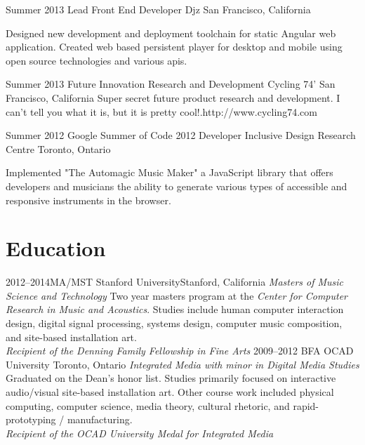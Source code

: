 \documentclass[10pt,a4paper,sans]{moderncv}   %
\begin{document}
\cventry
  {Summer 2013}
  {Lead Front End Developer}
  {Djz}
  {San Francisco, California}{}
  {Designed new development and deployment toolchain for static Angular web application.  Created web based persistent player for desktop and mobile using open source technologies and various apis.

\cventry
  {Summer 2013}
  {Future Innovation Research and Development}
  {Cycling 74'}
  {San Francisco, California}{}
  {Super secret future product research and development. I can't tell you what it is, but it is pretty cool!.\newline{}http://www.cycling74.com}

\cventry
  {Summer 2012}
  {Google Summer of Code 2012 Developer}
  {Inclusive Design Research Centre}
  {Toronto, Ontario}{}
  {Implemented "The Automagic Music Maker" a JavaScript library that offers developers and musicians the ability to generate various types of accessible and responsive instruments in the browser.


\section{Education}
\cventry
  {2012--2014}{MA/MST}
  {Stanford University}{Stanford, California}
  {\textit{Masters of Music Science and Technology}}
  {Two year masters program at the \textit{Center for Computer Research in Music and Acoustics}.  Studies include human computer interaction design, digital signal processing, systems design, computer music composition, and site-based installation art. \\\textit{Recipient of the Denning Family Fellowship in Fine Arts }}
\cventry
  {2009--2012}
  {BFA}
  {OCAD University}
  {Toronto, Ontario}
  {\textit{Integrated Media with minor in Digital Media Studies}}
  {Graduated on the Dean's honor list. Studies primarily focused on interactive audio/visual site-based installation art.  Other course work included physical computing, computer science, media theory, cultural rhetoric, and rapid-prototyping / manufacturing. \\\textit{Recipient of the OCAD University Medal for Integrated Media }}

}}
\end{document}
